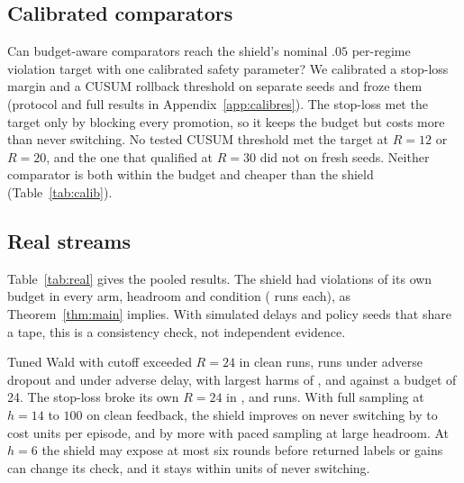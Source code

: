 \documentclass[10pt]{article}
\theoremstyle{plain}
\theoremstyle{definition}
\begin{document}


\begin{table}[!htbp]
\caption{Exceedance rates of $R=20$, pooled as the mean of per-regime rates over the six stress regimes and the 24 original regimes. Rates are rounded to three decimals; a displayed 0.000 need not mean zero run-level exceedances.}\label{tab:split}
\centering\small

\end{table}

\subsection{Calibrated comparators}\label{sec:calib}
Can budget-aware comparators reach the shield's nominal $.05$ per-regime violation target with one calibrated safety parameter? We calibrated a stop-loss margin and a CUSUM rollback threshold on separate seeds and froze them (protocol and full results in Appendix~\ref{app:calibres}). The stop-loss met the target only by blocking every promotion, so it keeps the budget but costs more than never switching. No tested CUSUM threshold met the target at $R=12$ or $R=20$, and the one that qualified at $R=30$ did not on fresh seeds. Neither comparator is both within the budget and cheaper than the shield (Table~\ref{tab:calib}).

\subsection{Real streams}
Table~\ref{tab:real} gives the pooled results. The shield had \RealShieldViolClean{} violations of its own budget in every arm, headroom and condition (\RealRunsPerArm{} runs each), as Theorem~\ref{thm:main} implies. With simulated delays and policy seeds that share a tape, this is a consistency check, not independent evidence.
\begin{table}[!htbp]
\caption{Real streams, pooled over 14 streams (equal weight), \RealRunsPerArm{} runs per arm and condition. $J$ is mean cost per episode, ``vs never'' the difference in $J$, ``viol.'' the number of runs above the budget: $R=24$ for the comparators, the arm's own $R$ ($24$, $60$ or $110$) for the shield and stop-loss.}\label{tab:real}
\centering\scriptsize
\resizebox{\linewidth}{!}{}
\end{table}
Tuned Wald with cutoff exceeded $R=24$ in \RealWaldExceedClean{} clean runs, \RealWaldExceedDropout{} runs under adverse dropout and \RealWaldExceedDelay{} under adverse delay, with largest harms of \RealWaldMaxClean, \RealWaldMaxDropout{} and \RealWaldMaxDelay{} against a budget of 24. The stop-loss broke its own $R=24$ in \RealStopExceedClean, \RealStopExceedDropout{} and \RealStopExceedDelay{} runs.
With full sampling at $h=14$ to $100$ on clean feedback, the shield improves on never switching by \RealPiVsNeverCleanHfourteen{} to \RealPiVsNeverCleanHhundred{} cost units per episode, and by more with paced sampling at large headroom. At $h=6$ the shield may expose at most six rounds before returned labels or gains can change its check, and it stays within \RealSixVsNever{} units of never switching.
\end{document}
